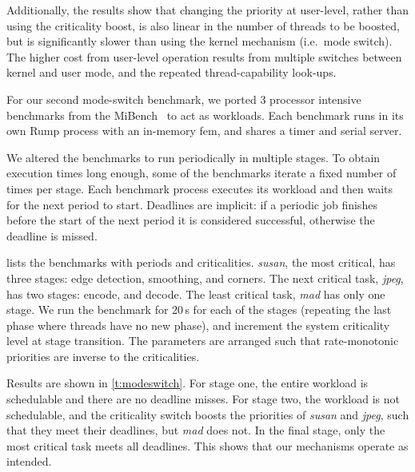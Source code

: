 Additionally, the results show that changing the priority at user-level, rather than using the
criticality boost, is also linear in the number of threads to be boosted, but  is significantly slower than using the kernel mechanism (i.e.\ mode switch).
The higher cost from user-level operation results from  multiple switches between kernel and user mode, and the repeated thread-capability look-ups.

For our second mode-switch benchmark, we ported 3 processor intensive benchmarks from the
MiBench~\citep{Guthaus_REAMB_01} to act as workloads. Each benchmark runs in its own Rump process
with an in-memory fem, and shares a timer and serial server.

We altered the benchmarks to run periodically in multiple stages. To obtain
execution times long enough, some of the benchmarks iterate a fixed number of times per
stage. Each benchmark process executes its workload and then waits for the next period to start.
Deadlines are implicit: if a periodic job finishes before the start of the next period it is
considered successful, otherwise the deadline is missed.

 lists the benchmarks with periods and criticalities.
\textit{susan}, the most critical, has three stages: edge detection, smoothing, and corners. The
next critical task, \textit{jpeg}, has two stages: encode, and decode. The least
critical task, \textit{mad} has only one stage. We run the benchmark
for 20\,s for each of the stages (repeating the last phase where
threads have no new phase), and
increment the system criticality level at stage transition. The parameters are arranged such that
rate-monotonic priorities are inverse to the criticalities.

Results are shown in \autoref{t:modeswitch}. For stage one, the entire workload is schedulable and
there are no deadline misses. For stage two, the workload is not
schedulable, and the criticality switch boosts the priorities of
\textit{susan} and \textit{jpeg}, such that they meet
their deadlines, but
\textit{mad} does not. In the final stage, only the most critical task
meets all deadlines.
This shows that our mechanisms operate as intended.

